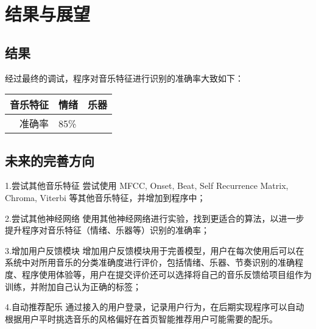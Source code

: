 \documentclass[a4paper,utf8,10pt]{article}
\begin{document}
\section{结果与展望}
\subsection{结果}

经过最终的调试，程序对音乐特征进行识别的准确率大致如下：

\begin{center}
\begin{tabular}{ r | l | l }
\hline
音乐特征 & 情绪 & 乐器 \\ \hline
  准确率 & 85\% &      \\ \hline
\end{tabular}
\end{center}

\subsection{未来的完善方向}
\item 1.尝试其他音乐特征
尝试使用 MFCC, Onset, Beat, Self Recurrence Matrix, Chroma, Viterbi 等其他音乐特征，并增加到程序中；
\item 2.尝试其他神经网络
使用其他神经网络进行实验，找到更适合的算法，以进一步提升程序对音乐特征（情绪、乐器等）识别的准确率；
\item 3.增加用户反馈模块
增加用户反馈模块用于完善模型，用户在每次使用后可以在系统中对所用音乐的分类准确度进行评价，包括情绪、乐器、节奏识别的准确程度、程序使用体验等，用户在提交评价还可以选择将自己的音乐反馈给项目组作为训练，并附加自己认为正确的标签；
\item 4.自动推荐配乐
通过接入的用户登录，记录用户行为，在后期实现程序可以自动根据用户平时挑选音乐的风格偏好在首页智能推荐用户可能需要的配乐。

{}

\end{document}
